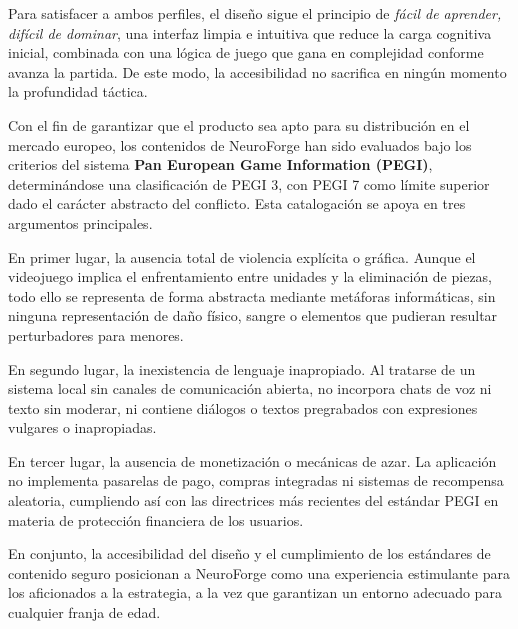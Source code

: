 Para satisfacer a ambos perfiles, el diseño sigue el principio de \textit{fácil de aprender, difícil de dominar}, una interfaz limpia e intuitiva que reduce la carga cognitiva inicial, combinada con una lógica de juego que gana en complejidad conforme avanza la partida. De este modo, la accesibilidad no sacrifica en ningún momento la profundidad táctica.

Con el fin de garantizar que el producto sea apto para su distribución en el mercado europeo, los contenidos de NeuroForge han sido evaluados bajo los criterios del sistema \textbf{Pan European Game Information (PEGI)}, determinándose una clasificación de PEGI 3, con PEGI 7 como límite superior dado el carácter abstracto del conflicto. Esta catalogación se apoya en tres argumentos principales.

En primer lugar, la ausencia total de violencia explícita o gráfica. Aunque el videojuego implica el enfrentamiento entre unidades y la eliminación de piezas, todo ello se representa de forma abstracta mediante metáforas informáticas, sin ninguna representación de daño físico, sangre o elementos que pudieran resultar perturbadores para menores.

En segundo lugar, la inexistencia de lenguaje inapropiado. Al tratarse de un sistema local sin canales de comunicación abierta, no incorpora chats de voz ni texto sin moderar, ni contiene diálogos o textos pregrabados con expresiones vulgares o inapropiadas.

En tercer lugar, la ausencia de monetización o mecánicas de azar. La aplicación no implementa pasarelas de pago, compras integradas ni sistemas de recompensa aleatoria, cumpliendo así con las directrices más recientes del estándar PEGI en materia de protección financiera de los usuarios.

En conjunto, la accesibilidad del diseño y el cumplimiento de los estándares de contenido seguro posicionan a NeuroForge como una experiencia estimulante para los aficionados a la estrategia, a la vez que garantizan un entorno adecuado para cualquier franja de edad.